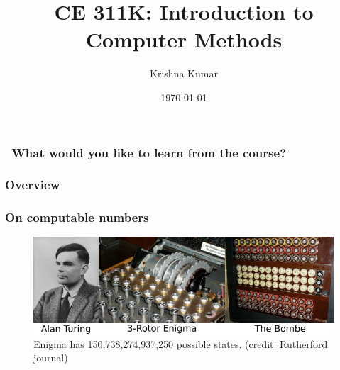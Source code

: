 \documentclass[notes]{beamer}
\title[CE 311K: Intro to Computer Methods]{CE 311K: Introduction to Computer Methods}
\author{Krishna Kumar} %
\institute[UT Austin] %
{
University of Texas at Austin \\
\medskip
\href{mailto:krishnak@utexas.edu}{krishnak@utexas.edu} %
}
\date{\today} %
\begin{document}
\begin{frame}
\titlepage %
\end{frame}


\begin{frame}
	\frametitle{\faCommentsO ~What would you like to learn from the course?}

\end{frame}

\begin{frame}
 \frametitle{Overview}
 \tableofcontents
\end{frame}

\newif\ifshowtoc
\showtoctrue%

\AtBeginSection{%
	\ifshowtoc
	\begin{frame}
		\tableofcontents[currentsection, subsectionstyle=show/show/hide]
	\end{frame}
	\fi
}

\begin{frame}
	\frametitle{On computable numbers}
	\begin{figure}[ht]
		\centering
		\includegraphics[width=\textwidth]{figs/turing-bombe.png}
		\caption*{Enigma has 150,738,274,937,250 possible states. (credit: Rutherford journal)}
	\end{figure}
\end{frame}
\end{document}
